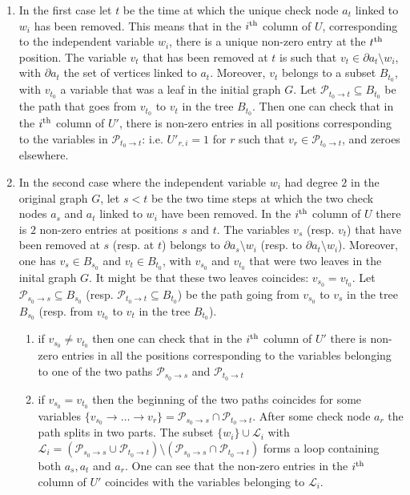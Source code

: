 \documentclass{article}
\begin{document}
\begin{enumerate}
    \item In the first case let $t$ be the time at which the unique check node $a_t$ linked to $w_i$ has been removed. This means that in the $i^{\rm th}$ column of $U$, corresponding to the independent variable $w_i$, there is a unique non-zero entry at the $t^{\rm th}$ position. The variable $v_t$ that has been removed at $t$ is such that $v_t\in\partial a_t\setminus w_i$, with $\partial a_t$ the set of vertices linked to $a_t$. Moreover, $v_t$ belongs to a subset $B_{t_0}$, with $v_{t_0}$ a variable that was a leaf in the initial graph $G$. Let $\mathcal{P}_{t_0\to t}\subseteq B_{t_0}$ be the path that goes from $v_{t_0}$ to $v_t$ in the tree $B_{t_0}$. Then one can check that in the $i^{\rm th}$ column of $U'$, there is non-zero entries in all positions corresponding to the variables in $\mathcal{P}_{t_0\to t}$: i.e. $U'_{r,i}=1$ for $r$ such that $v_r\in\mathcal{P}_{t_0\to t}$, and zeroes elsewhere.

    \item In the second case where the independent variable $w_i$ had degree $2$ in the original graph $G$, let $s<t$ be the two time steps at which the two check nodes $a_s$ and $a_t$ linked to $w_i$ have been removed. In the $i^{\rm th}$ column of $U$ there is $2$ non-zero entries at positions $s$ and $t$. The variables $v_s$ (resp. $v_t$) that have been removed at $s$ (resp. at $t$) belongs to $\partial a_s\setminus w_i$ (resp. to $\partial a_t\setminus w_i$). Moreover, one has $v_s\in B_{s_0}$ and $v_t\in B_{t_0}$, with $v_{s_0}$ and $v_{t_0}$ that were two leaves in the inital graph $G$. It might be that these two leaves coincides: $v_{s_0}=v_{t_0}$. Let $\mathcal{P}_{s_0\to s}\subseteq B_{s_0}$ (resp. $\mathcal{P}_{t_0\to t}\subseteq B_{t_0}$) be the path going from $v_{s_0}$ to $v_s$ in the tree $B_{s_0}$ (resp. from $v_{t_0}$ to $v_t$ in the tree $B_{t_0}$). 
    \begin{enumerate}
        \item if $v_{s_0}\neq v_{t_0}$ then one can check that in the $i^{\rm th}$ column of $U'$ there is non-zero entries in all the positions corresponding to the variables belonging to one of the two paths $\mathcal{P}_{s_0\to s}$ and $\mathcal{P}_{t_0\to t}$ 
        \item if $v_{s_0}= v_{t_0}$ then the beginning of the two paths coincides for some variables $\{v_{s_0}\to \dots\to v_r\}=\mathcal{P}_{s_0\to s}\cap\mathcal{P}_{t_0\to t}$. After some check node $a_r$ the path splits in two parts. The subset $\{w_i\}\cup\mathcal{L}_i$ with $\mathcal{L}_i=(\mathcal{P}_{s_0\to s}\cup\mathcal{P}_{t_0\to t})\setminus(\mathcal{P}_{s_0\to s}\cap\mathcal{P}_{t_0\to t})$ forms a loop containing both $a_s, a_t$ and $a_r$. One can see that the non-zero entries in the $i^{\rm th}$ column of $U'$ coincides with the variables belonging to $\mathcal{L}_i$.
    \end{enumerate}
\end{enumerate}
\end{document}
